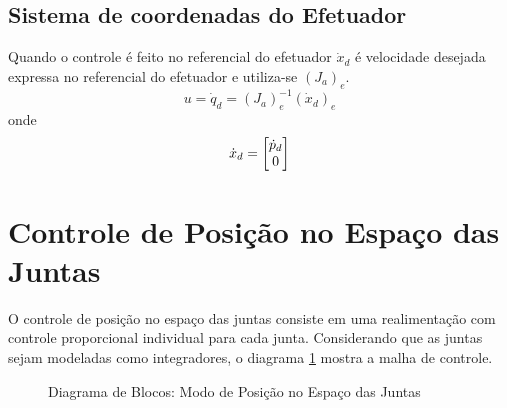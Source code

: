 \subsection{Sistema de coordenadas do Efetuador} \label{sec:openloopefct}
Quando o controle é feito no referencial do efetuador ${\dot{x}}_d$ é velocidade desejada expressa no referencial do efetuador e utiliza-se $({J}_{a})_e$.
\begin{equation}
{u} = {\dot{q}}_d = ({J}_{a})_e^{-1} ({\dot{x}}_d)_e
\end{equation}
onde 
\begin{equation}
{\dot{x}}_d = \begin{bmatrix}{\dot{p}}_d \\ 0\end{bmatrix}
\end{equation}

\section{Controle de Posição no Espaço das Juntas} \label{sec:position_joint}
O controle de posição no espaço das juntas consiste em uma realimentação com controle proporcional individual para cada junta. Considerando que as juntas sejam modeladas como integradores, o diagrama \ref{fig:pos_juntas} mostra a malha de controle.

\begin{figure}[h!]
\centering
{}
\caption{Diagrama de Blocos: Modo de Posição no Espaço das Juntas}
\label{fig:pos_juntas}
\end{figure}


